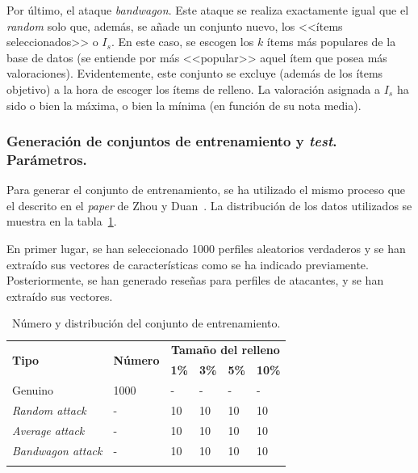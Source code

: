 Por último, el ataque \textit{bandwagon}. Este ataque se realiza exactamente igual que el \textit{random} solo que, además, se añade un conjunto nuevo, los <<ítems seleccionados>> o $I_s$. En este caso, se escogen los $k$ ítems más populares de la base de datos (se entiende por más <<popular>> aquel ítem que posea más valoraciones). Evidentemente, este conjunto se excluye (además de los ítems objetivo) a la hora de escoger los ítems de relleno. La valoración asignada a $I_s$ ha sido o bien la máxima, o bien la mínima (en función de su nota media).

\subsubsection{Generación de conjuntos de entrenamiento y \textit{test}. Parámetros.}

Para generar el conjunto de entrenamiento, se ha utilizado el mismo proceso que el descrito en el \textit{paper} de Zhou y Duan~\cite{zhou2021SemisupervisedRecommendationAttack}. La distribución de los datos utilizados se muestra en la tabla~\ref{tbl:entrenamiento_ML10M}.

En primer lugar, se han seleccionado 1000 perfiles aleatorios verdaderos y se han extraído sus vectores de características como se ha indicado previamente. Posteriormente, se han generado reseñas para perfiles de atacantes, y se han extraído sus vectores.

\begin{table}
	\begin{centering}
		\begin{tabular}{@{} p{9em} p{7em} p{3em} p{3em} p{3em} p{3em} @{}}
			\toprule
			\multirow{2}{*}{\hfil \textbf{Tipo}} & \multirow{2}{*}{\hfil \textbf{Número}} & \multicolumn{4}{c}{\hfil \textbf{Tamaño del relleno}} \\ \cmidrule{3-6}
			&\hfil   &\hfil \textbf{1\%} &\hfil \textbf{3\%} & \hfil \textbf{5\%} & \hfil \textbf{10\%}\\ 
			\toprule
			Genuino &1000&\hfil -	& \hfil -  & \hfil - & \hfil -\\
			\textit{Random attack} &-	&\hfil 10 & \hfil 10	&  \hfil 10 & \hfil 10\\
			\textit{Average attack} &-	& \hfil 10 & \hfil 10 & \hfil 10 & \hfil 10 \\
			\textit{Bandwagon attack} &- & \hfil 10 & \hfil 10 & \hfil 10 & \hfil10 \\
			\\ \bottomrule
		\end{tabular}
	\end{centering}
	\caption{Número y distribución del conjunto de entrenamiento.}
	\label{tbl:entrenamiento_ML10M}	
\end{table}

